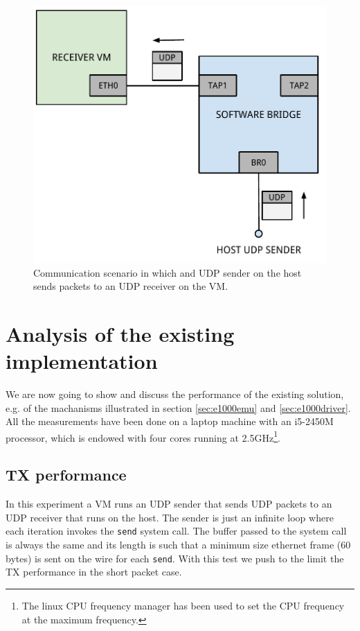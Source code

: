 \begin{figure}[bt]
\centering
\includegraphics[scale = 0.60]{scenario-2.pdf}
\caption{Communication scenario in which and UDP sender on the host sends packets to an UDP receiver on the VM.}
\label{fig:scenario-2}
\end{figure}


\section{Analysis of the existing implementation}
\label{sec:e1000perf}
We are now going to show and discuss the performance of the existing solution, e.g. of the machanisms illustrated in section 
\ref{sec:e1000emu} and \ref{sec:e1000driver}.
All the measurements have been done on a laptop machine with an i5-2450M processor, which is endowed with four cores running at 
2.5GHz\footnote{The linux CPU frequency manager has been used to set the CPU frequency at the maximum frequency.}.

\subsection{TX performance}
\label{sec:e1000txperf}
In this experiment a VM runs an UDP sender that sends UDP packets to an UDP receiver that runs on the host. The sender is just an 
infinite loop where each iteration invokes the \texttt{send} system call. The buffer passed to the system call is always the same and its
length is such that a minimum size ethernet frame (60 bytes) is sent on the wire for each \texttt{send}.
With this test we push to the limit the TX performance in the short packet case.


